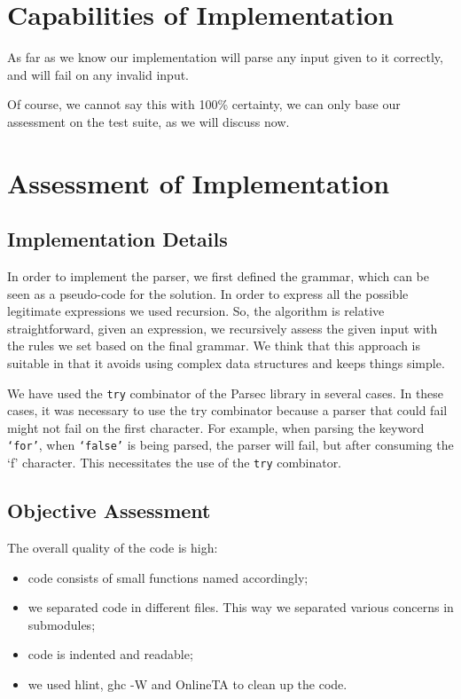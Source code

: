 \documentclass{article}
\begin{document}
\section{Capabilities of Implementation}
As far as we know our implementation will parse any input given to it correctly, and will fail on any invalid input. 

Of course, we cannot say this with 100\% certainty, we can only base our assessment on the test suite, as we will discuss now.


\section{Assessment of Implementation}

\subsection{Implementation Details}
In order to implement the parser, we first defined the grammar, which can be seen as a pseudo-code for the solution. In order to express all the possible legitimate expressions we used recursion. So, the algorithm is relative straightforward, given an expression, we recursively assess the given input with the rules we set based on the final grammar. We think that this approach is suitable in that it avoids using complex data structures and keeps things simple.

We have used the \texttt{try} combinator of the Parsec library in several cases. In these cases, it was necessary to use the try combinator because a parser that could fail might not fail on the first character. For example, when parsing the keyword \texttt{`for'}, when \texttt{`false'} is being parsed, the parser will fail, but after consuming the `f' character. This necessitates the use of the \texttt{try} combinator.

\subsection{Objective Assessment}
The overall quality of the code is high: 
\begin{itemize}
	\item code consists of small functions named accordingly;
	\item we separated code in different files. This way we separated various concerns in submodules;
	\item code is indented and readable;
	\item we used hlint, ghc -W and OnlineTA to clean up the code.
\end{itemize}
 
\end{document}
